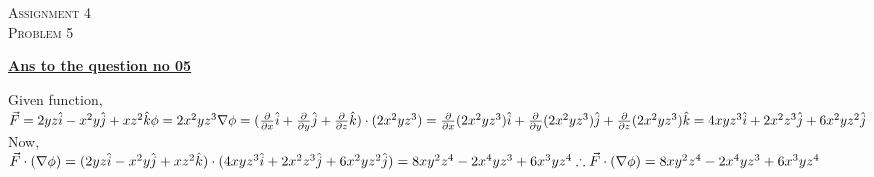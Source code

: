 \documentclass{article}
\begin{document}
\begin{newpage}
    \begin{flushright}
    \textsc{Assignment 4}\\
    \textsc{Problem 5}\\
    [1 cm]
    \end{flushright}
\begin{center}
  \textbf{\Large \underline {Ans to the question no 05}}\\
  [0.5 cm]
\end{center}
\Large {Given function, \\[3mm]
$ \vec{F} = 2yz\hat{i}-x^2y\hat{j} + xz^2\hat{k}\\[3mm]
\phi =2x^2yz^3\\[3mm]
\nabla \phi = (\frac{\partial}{\partial x}\hat{i}+\frac{\partial }{\partial y}\hat{j}+\frac{\partial }{\partial z}\hat{k}) \cdot (2x^2yz^3)\\[3mm]
=\frac{\partial}{\partial x}(2x^2yz^3)\hat{i}+\frac{\partial}{\partial y}(2x^2yz^3)\hat{j}+\frac{\partial}{\partial z}(2x^2yz^3)\hat{k}\\[3mm]
=4xyz^3\hat{i}+2x^2z^3\hat{j}+6x^2yz^2\hat{j}$\\[3mm]
Now,\\[3mm]
$\vec{F}\cdot (\nabla \phi)=(2yz\hat{i}-x^2y\hat{j} + xz^2\hat{k}) \cdot (4xyz^3\hat{i}+2x^2z^3\hat{j}+6x^2yz^2\hat{j})\\[3mm]
=8xy^2z^4-2x^4yz^3+6x^3yz^4\\[5mm]
\therefore \vec{F}\cdot (\nabla \phi)=8xy^2z^4-2x^4yz^3+6x^3yz^4$}
\end{newpage}
\end{document}
